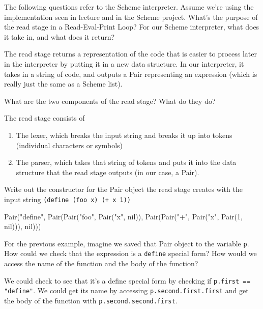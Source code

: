 \begin{blocksection}
The following questions refer to the Scheme interpreter. Assume we're using the implementation seen in lecture and 
in the Scheme project.
\question What's the purpose of the read stage in a Read-Eval-Print Loop? For our Scheme interpreter, what does it 
take in, and what does it return?
\begin{solution}[1in] 
The read stage returns a representation of the code that is easier to process later in the interpreter by putting it in a new data structure. In our interpreter,
it takes in a string of code, and outputs a Pair representing an expression (which is really just the same as a Scheme list).
\end{solution}

\question What are the two components of the read stage? What do they do?
\begin{solution}[1in]
The read stage consists of
\begin{enumerate}[1.]
\item The lexer, which breaks the input string and breaks it up into tokens (individual characters or symbols)
\item The parser, which takes that string of tokens and puts it into the data structure that the read stage outputs (in our case, a Pair).
\end{enumerate}
\end{solution}

\question Write out the constructor for the Pair object the read stage creates with the input string \texttt{(define (foo x) (+ x 1))}
\begin{solution}[1in]
Pair("define", Pair(Pair("foo", Pair("x", nil)), Pair(Pair("+", Pair("x", Pair(1, nil))), nil)))
\end{solution}

\question For the previous example, imagine we saved that Pair object to the variable \texttt{p}. How could we check that the expression 
is a \texttt{define} special form? How would we access the name of the function and the body of the function?
\begin{solution}[1in]
We could check to see that it's a define special form by checking if \lstinline$p.first == "define"$. 
\newline
We could get its name by accessing \lstinline$p.second.first.first$ and get the body of the function with \lstinline$p.second.second.first$.
\end{solution}
\end{blocksection}